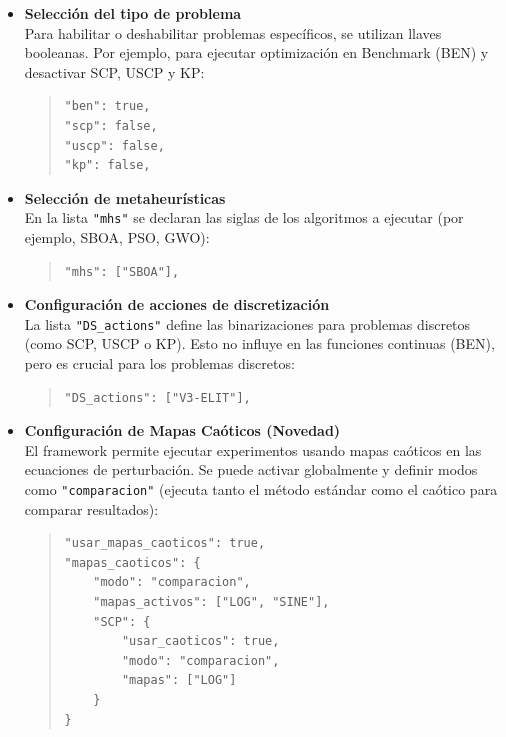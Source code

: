 \begin{itemize}

\item \textbf{Selección del tipo de problema}
\\
Para habilitar o deshabilitar problemas específicos, se utilizan llaves booleanas. Por ejemplo, para ejecutar optimización en Benchmark (BEN) y desactivar SCP, USCP y KP:
\begin{quote}
\begin{verbatim}
"ben": true, 
"scp": false, 
"uscp": false,
"kp": false,
\end{verbatim}
\end{quote}

\item \textbf{Selección de metaheurísticas}
\\
En la lista \texttt{"mhs"} se declaran las siglas de los algoritmos a ejecutar (por ejemplo, SBOA, PSO, GWO):
\begin{quote}
\begin{verbatim}
"mhs": ["SBOA"],
\end{verbatim}
\end{quote}

\item \textbf{Configuración de acciones de discretización}
\\
La lista \texttt{"DS\_actions"} define las binarizaciones para problemas discretos (como SCP, USCP o KP). Esto no influye en las funciones continuas (BEN), pero es crucial para los problemas discretos:
\begin{quote}
\begin{verbatim}
"DS_actions": ["V3-ELIT"],
\end{verbatim}
\end{quote}

\item \textbf{Configuración de Mapas Caóticos (Novedad)}
\\
El framework permite ejecutar experimentos usando mapas caóticos en las ecuaciones de perturbación. Se puede activar globalmente y definir modos como \texttt{"comparacion"} (ejecuta tanto el método estándar como el caótico para comparar resultados):
\begin{quote}
\begin{verbatim}
"usar_mapas_caoticos": true,
"mapas_caoticos": {
    "modo": "comparacion",
    "mapas_activos": ["LOG", "SINE"],
    "SCP": {
        "usar_caoticos": true,
        "modo": "comparacion",
        "mapas": ["LOG"]
    }
}
\end{verbatim}
\end{quote}


\end{itemize}
